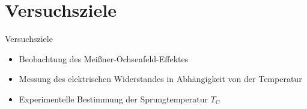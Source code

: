 \section{Versuchsziele}
\begin{frame}{Versuchsziele}
\begin{itemize}
  \item Beobachtung des Meißner-Ochsenfeld-Effektes
  \item Messung des elektrischen Widerstandes in Abhängigkeit von der Temperatur
  \item Experimentelle Bestimmung der Sprungtemperatur $T_{\mathup{C}}$
\end{itemize}
\end{frame}
